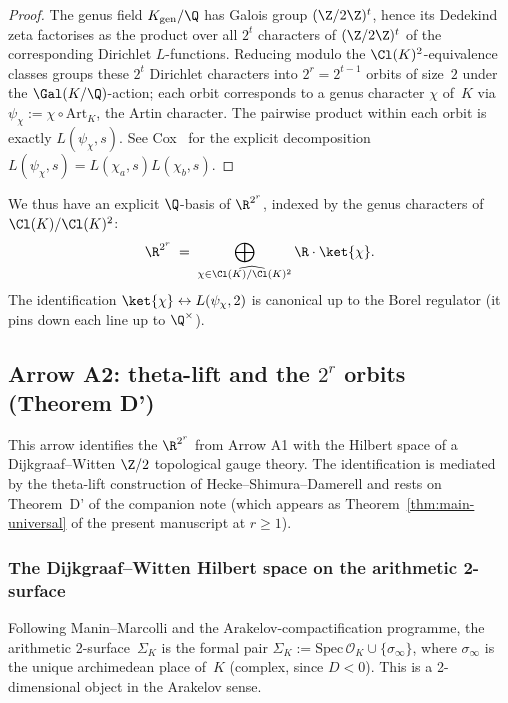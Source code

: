 \begin{proof}
The genus field $K_{\mathrm{gen}}/\Q$ has Galois group
$(\Z/2\Z)^t$, hence its Dedekind zeta factorises as the product over
all $2^t$ characters of $(\Z/2\Z)^t$ of the corresponding Dirichlet
$L$-functions.  Reducing modulo the $\Cl(K)^2$-equivalence classes
groups these $2^t$ Dirichlet characters into $2^r = 2^{t-1}$ orbits of
size~$2$ under the $\Gal(K/\Q)$-action; each orbit corresponds to a
genus character $\chi$ of~$K$ via
$\psi_\chi := \chi \circ \mathrm{Art}_K$, the Artin character.
The pairwise product within each orbit is exactly
$L(\psi_\chi, s)$.  See Cox~\cite[Thm.~7.7]{Cox1989} for the explicit
decomposition $L(\psi_\chi, s) = L(\chi_a, s) L(\chi_b, s)$.
\end{proof}

\noindent We thus have an explicit $\Q$-basis of $\R^{2^r}$, indexed
by the genus characters of~$\Cl(K)/\Cl(K)^2$:
\[
   \R^{2^r} \;=\;
   \bigoplus_{\chi \in \widehat{\Cl(K)/\Cl(K)^2}}
   \R \cdot \ket{\chi}.
\]
The identification $\ket{\chi} \leftrightarrow L(\psi_\chi, 2)$ is
canonical up to the Borel regulator (it pins down each line up to
$\Q^\times$).

\subsection{Arrow A2: theta-lift and the $2^r$ orbits (Theorem D')}
\label{sec:conjF-theta}

This arrow identifies the $\R^{2^r}$ from Arrow A1 with the Hilbert
space of a Dijkgraaf--Witten $\Z/2$ topological gauge theory.  The
identification is mediated by the theta-lift construction of
Hecke--Shimura--Damerell and rests on Theorem~D' of the companion
note \cite{ThmDPrime2026} (which appears as
Theorem~\ref{thm:main-universal} of the present manuscript at $r \ge 1$).

\subsubsection{The Dijkgraaf--Witten Hilbert space on the arithmetic
2-surface}
\label{sec:conjF-DW}

Following Manin--Marcolli \cite{ManinMarcolli2002} and the
Arakelov-compactification programme, the arithmetic
2-surface~$\Sigma_K$ is the formal pair
$\Sigma_K := \mathrm{Spec}\, \mathcal{O}_K \cup \{\sigma_\infty\}$,
where $\sigma_\infty$ is the unique archimedean place of~$K$
(complex, since $D < 0$).  This is a 2-dimensional object in the
Arakelov sense.

